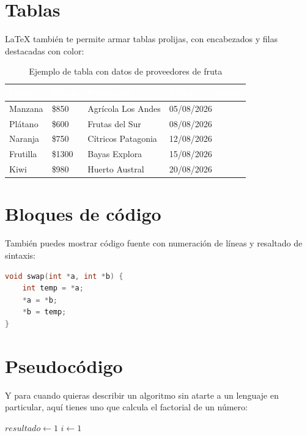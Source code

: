 \documentclass[12pt]{article}
\begin{document}
\section{Tablas}

\LaTeX{} también te permite armar tablas prolijas, con encabezados y filas destacadas con color:

\begin{table}[h]
    \centering
    \begin{tabular}{|l|l|l|l|}
        \hline
        \rowcolor{black}
        \textcolor{white}{\textbf{Fruta}} & \textcolor{white}{\textbf{Precio}} & \textcolor{white}{\textbf{Proveedor}} & \textcolor{white}{\textbf{Fecha de entrega}} \\
        \hline
        Manzana  & \$850  & Agrícola Los Andes  & 05/08/2026 \\
        Plátano  & \$600  & Frutas del Sur      & 08/08/2026 \\
        Naranja  & \$750  & Cítricos Patagonia  & 12/08/2026 \\
        Frutilla & \$1300 & Bayas Explora       & 15/08/2026 \\
        Kiwi     & \$980  & Huerto Austral      & 20/08/2026 \\
        \hline
    \end{tabular}
    \caption{Ejemplo de tabla con datos de proveedores de fruta}
\end{table}

\section{Bloques de código}

También puedes mostrar código fuente con numeración de líneas y resaltado de sintaxis:

\begin{lstlisting}[language=C, caption={Función de intercambio (swap)}, style=CodeStyle]
void swap(int *a, int *b) {
    int temp = *a;
    *a = *b;
    *b = temp;
}
\end{lstlisting}

\section{Pseudocódigo}

Y para cuando quieras describir un algoritmo sin atarte a un lenguaje en particular, aquí tienes uno que calcula el factorial de un número:

\begin{algorithm}[H]
    \caption{Cálculo del factorial de $n$}
    $resultado \leftarrow 1$\;
    $i \leftarrow 1$\;
    \;
\end{algorithm}
\end{document}
